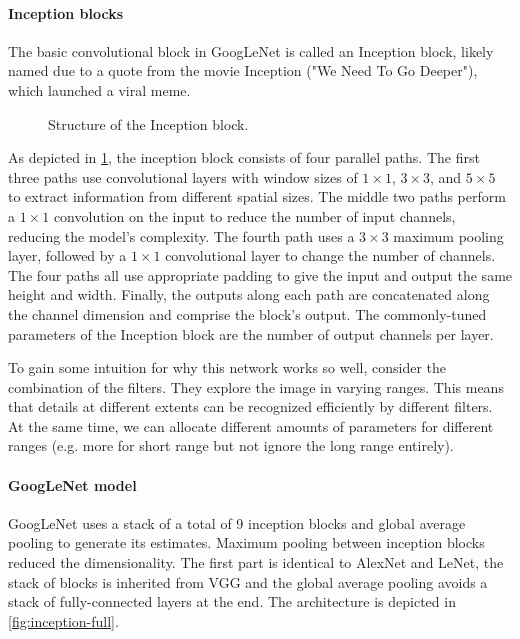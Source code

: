 \paragraph{Inception blocks}

The basic convolutional block in GoogLeNet is called an Inception block, likely named due to a quote from the movie Inception ("We Need To Go Deeper"), which launched a viral meme.

\begin{figure}[hpt]
	\centering
	
	\caption{Structure of the Inception block.}
	\label{fig:inception}
\end{figure}

As depicted in \cref{fig:inception}, the inception block consists of four parallel paths. The first three paths use convolutional layers 
with window sizes of $1\times 1$, $3\times 3$, and $5\times 5$ to extract information from different spatial sizes. The middle two paths perform a $1\times 1$ convolution on the input to reduce the number of input channels, reducing the model's complexity. 
The fourth path uses a $3\times 3$ maximum pooling layer, followed by a $1\times 1$ convolutional layer to change the number of channels. The four paths all use appropriate padding to give the input and output the same height and width. Finally, the outputs along each path are concatenated along the channel dimension and comprise the block's output. The commonly-tuned parameters of the Inception block are the number of output channels per layer.

To gain some intuition for why this network works so well, consider the combination of the filters. They explore the image in varying ranges.  This means that details at different extents can be recognized efficiently by different filters. At the same time, we can allocate different amounts of parameters for different ranges (e.g. more for short range but not ignore the long range entirely).

\paragraph{GoogLeNet model}

GoogLeNet uses a stack of a total of 9 inception blocks  and global average pooling to generate its estimates. Maximum pooling between inception blocks reduced the dimensionality.  The first part is identical to AlexNet and LeNet, the stack of blocks is inherited from VGG and the global average pooling avoids a stack of fully-connected layers at the end. The architecture is depicted in \cref{fig:inception-full}.

